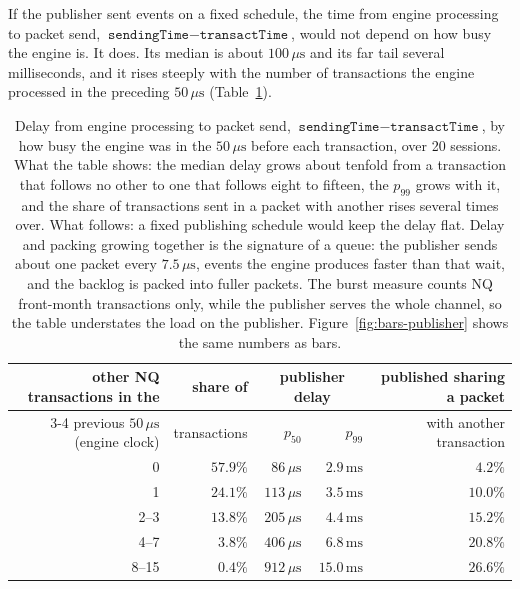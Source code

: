 \documentclass[11pt]{article}
\begin{document}
If the publisher sent events on a fixed schedule, the time from engine processing to
packet send, $\texttt{sendingTime} - \texttt{transactTime}$, would not depend on how busy
the engine is. It does. Its median is about $100\,\mu\mathrm{s}$ and its far tail several
milliseconds, and it rises steeply with the number of transactions the engine processed in
the preceding $50\,\mu\mathrm{s}$ (Table~\ref{tab:publisher}).

\begin{table}[H]
\centering
\small
\begin{tabular}{@{}r r rr r@{}}
\toprule
other NQ transactions in the & share of & \multicolumn{2}{c}{publisher delay} & published sharing a packet \\
\cmidrule(lr){3-4}
previous $50\,\mu\mathrm{s}$ (engine clock) & transactions & $p_{50}$ & $p_{99}$ & with another transaction \\
\midrule
0      & $57.9\%$ & $86\,\mu\mathrm{s}$  & $2.9\,\mathrm{ms}$  & $4.2\%$ \\
1      & $24.1\%$ & $113\,\mu\mathrm{s}$ & $3.5\,\mathrm{ms}$  & $10.0\%$ \\
2--3   & $13.8\%$ & $205\,\mu\mathrm{s}$ & $4.4\,\mathrm{ms}$  & $15.2\%$ \\
4--7   & $3.8\%$  & $406\,\mu\mathrm{s}$ & $6.8\,\mathrm{ms}$  & $20.8\%$ \\
8--15  & $0.4\%$  & $912\,\mu\mathrm{s}$ & $15.0\,\mathrm{ms}$ & $26.6\%$ \\
\bottomrule
\end{tabular}
\caption{Delay from engine processing to packet send, $\texttt{sendingTime} -
\texttt{transactTime}$, by how busy the engine was in the $50\,\mu\mathrm{s}$ before each
transaction, over 20 sessions. What the table shows: the median delay grows about tenfold
from a transaction that follows no other to one that follows eight to fifteen, the
$p_{99}$ grows with it, and the share of transactions sent in a packet with another rises
several times over. What follows: a fixed publishing schedule would keep the delay flat.
Delay and packing growing together is the signature of a queue: the publisher sends about
one packet every $7.5\,\mu\mathrm{s}$, events the engine produces faster than that wait,
and the backlog is packed into fuller packets. The burst measure counts NQ front-month
transactions only, while the publisher serves the whole channel, so the table understates
the load on the publisher. Figure~\ref{fig:bars-publisher} shows the same numbers as bars.}
\label{tab:publisher}
\end{table}
\end{document}
